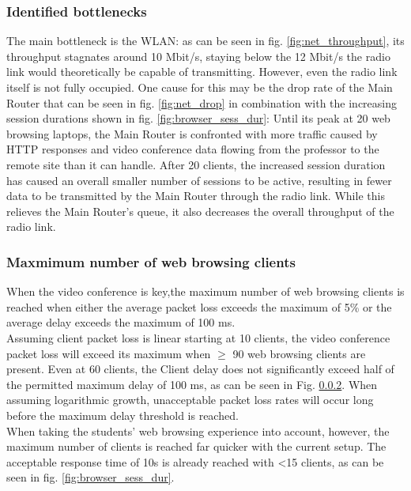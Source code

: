 \documentclass[
10pt, %
a4paper, %
oneside, %
headinclude,footinclude, %
BCOR5mm, %
]{scrartcl}
\begin{document}
\subsubsection{Identified bottlenecks}
The main bottleneck is the WLAN: as can be seen in fig. \ref{fig:net_throughput}, its throughput stagnates around 10 Mbit/s, staying below the 12 Mbit/s the radio link would theoretically be capable of transmitting. However, even the radio link itself is not fully occupied. One cause for this may be the drop rate of the Main Router that can be seen in fig. \ref{fig:net_drop} in combination with the increasing session durations shown in fig. \ref{fig:browser_sess_dur}: Until its peak at 20 web browsing laptops, the Main Router is confronted with more traffic caused by HTTP responses and video conference data flowing from the professor to the remote site than it can handle. After 20 clients, the increased session duration has caused an overall smaller number of sessions to be active, resulting in fewer data to be transmitted by the Main Router through the radio link. While this relieves the Main Router's queue, it also decreases the overall throughput of the radio link.

\subsubsection{Maxmimum number of web browsing clients}
When the video conference is key,the maximum number of web browsing clients is reached when either the average packet loss exceeds the maximum of 5\% or the average delay exceeds the maximum of 100 ms.\\
Assuming client packet loss is linear starting at 10 clients, the video conference packet loss will exceed its maximum when $\geq$ 90 web browsing clients are present.
Even at 60 clients, the Client delay does not significantly exceed half of the permitted maximum delay of 100 ms, as can be seen in Fig. \ref{}. When assuming logarithmic growth, unacceptable packet loss rates will occur long before the maximum delay threshold is reached. \\

When taking the students' web browsing experience into account, however, the maximum number of clients is reached far quicker with the current setup. The acceptable response time of 10s is already reached with \textless 15 clients, as can be seen in fig. \ref{fig:browser_sess_dur}.%
\end{document}
